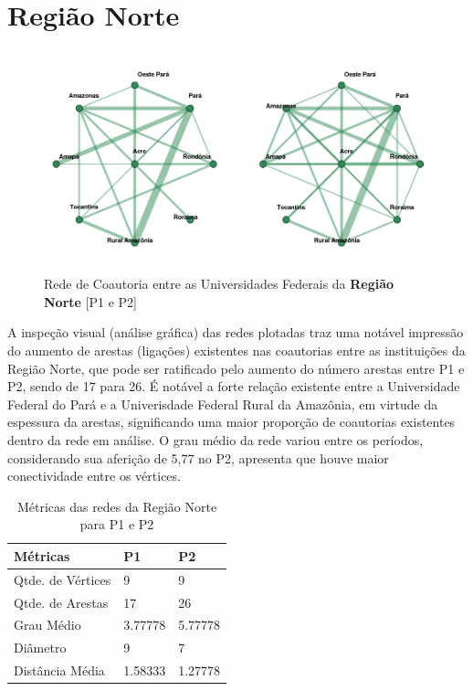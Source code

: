 \documentclass[12pt]{article}
\begin{document}
\section{Região Norte}

\begin{figure}[H]
\centering
\includegraphics[scale=0.6]{images/norte.png}
\caption{Rede de Coautoria entre as Universidades Federais da \textbf{Região Norte} [P1 e P2]}
\label{rede-norte}
\end{figure}

A inspeção visual (análise gráfica) das redes plotadas traz uma notável impressão do aumento de arestas (ligações) existentes nas coautorias entre as instituições da Região Norte, que pode ser ratificado pelo aumento do número arestas entre P1 e P2, sendo de 17 para 26. É notável a forte relação existente entre a Universidade Federal do Pará e a Univerisdade Federal Rural da Amazônia, em virtude da espessura da arestas, significando uma maior proporção de coautorias existentes dentro da rede em análise. O grau médio da rede variou entre os períodos, considerando sua aferição de 5,77 no P2, apresenta que houve maior conectividade entre os vértices.



\begin{table}[H]
\centering
\begin{tabular}{lll}
\hline
\rowcolor[HTML]{C0C0C0} 
\textbf{Métricas} & \textbf{P1} & \textbf{P2} \\ \hline
Qtde. de Vértices & 9           & 9           \\ \hline
Qtde. de Arestas  & 17          & 26          \\ \hline
Grau Médio        & 3.77778     & 5.77778     \\ \hline
Diâmetro          & 9           & 7           \\ \hline
Distância Média   & 1.58333     & 1.27778     \\ \hline
\end{tabular}
\caption{Métricas das redes da Região Norte para P1 e P2}
\end{table}
\end{document}
